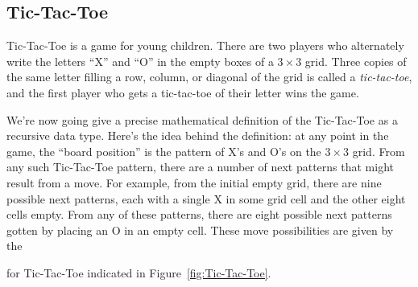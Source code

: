 \begin{definition}
\subsection{Tic-Tac-Toe}

Tic-Tac-Toe is a game for young children.  There are two players who
alternately write the letters ``X'' and ``O'' in the empty boxes of a $3
\times 3$ grid.  Three copies of the same letter filling a row, column, or
diagonal of the grid is called a \emph{tic-tac-toe}, and the first player
who gets a tic-tac-toe of their letter wins the game.  


We're now going give a precise mathematical definition of the Tic-Tac-Toe
 as a recursive data type.  Here's the idea behind the definition: at any point in the
game, the ``board position'' is the pattern of X's and O's on the $3 \times
3$ grid.  From any such Tic-Tac-Toe pattern, there are a number of next
patterns that might result from a move.  For example, from the initial
empty grid, there are nine possible next patterns, each with a single X in
some grid cell and the other eight cells empty.  From any of these
patterns, there are eight possible next patterns gotten by placing an O in
an empty cell.  These move possibilities are given by the
 for Tic-Tac-Toe indicated in
Figure~\ref{fig:Tic-Tac-Toe}.


\end{definition}
